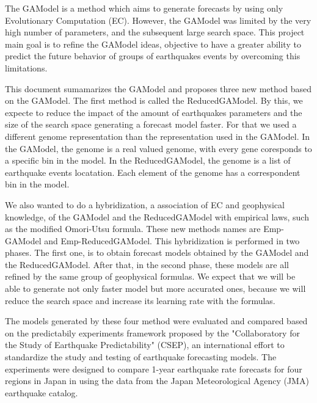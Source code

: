 The GAModel is a method which aims to generate forecasts by using only
Evolutionary Computation (EC). However, the GAModel was limited by the
very high number of parameters, and the subsequent large search
space. This project main goal is to refine the GAModel ideas,
objective to have a greater ability to predict the future behavior of
groups of earthquakes events by overcoming this limitations.

This document sumamarizes the GAModel and proposes three new method
based on the GAModel. The first method is called the
ReducedGAModel. By this, we expecte to reduce the impact of the amount
of earthquakes parameters and the size of the search space generating
a forecast model faster. For that we used a different genome
representation than the representation used in the GAModel. In the
GAModel, the genome is a real valued genome, with every gene
coresponds to a specific bin in the model. In the ReducedGAModel, the
genome is a list of earthquake events locatation. Each element of the
genome has a correspondent bin in the model.

We also wanted to do a hybridization, a association of EC and
geophysical knowledge, of the GAModel and the ReducedGAModel with
empirical laws, such as the modified Omori-Utsu formula. These new
methods names are Emp-GAModel and Emp-ReducedGAModel. This
hybridization is performed in two phases. The first one, is to obtain
forecast models obtained by the GAModel and the ReducedGAModel. After
that, in the second phase, these models are all refined by the same
group of geophysical formulas. We expect that we will be able to
generate not only faster model but more accurated ones, because we
will reduce the search space and increase its learning rate with the
formulas.


The models generated by these four method were evaluated and compared
based on the predictabily experiments framework proposed by the
"Collaboratory for the Study of Earthquake Predictability" (CSEP), an
international effort to standardize the study and testing of
earthquake forecasting models. The experiments were designed to
compare 1-year earthquake rate forecasts for four regions in Japan in
using the data from the Japan Meteorological Agency (JMA) earthquake
catalog.